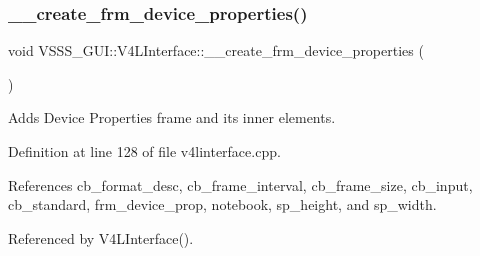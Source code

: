 \subsubsection{\texorpdfstring{\+\_\+\+\_\+create\+\_\+frm\+\_\+device\+\_\+properties()}{\_\_create\_frm\_device\_properties()}}
{\footnotesize\ttfamily void V\+S\+S\+S\+\_\+\+G\+U\+I\+::\+V4\+L\+Interface\+::\+\_\+\+\_\+create\+\_\+frm\+\_\+device\+\_\+properties (\begin{DoxyParamCaption}{ }\end{DoxyParamCaption})\hspace{0.3cm}{\ttfamily [private]}}



Adds Device Properties frame and its inner elements. 



Definition at line 128 of file v4linterface.\+cpp.



References cb\+\_\+format\+\_\+desc, cb\+\_\+frame\+\_\+interval, cb\+\_\+frame\+\_\+size, cb\+\_\+input, cb\+\_\+standard, frm\+\_\+device\+\_\+prop, notebook, sp\+\_\+height, and sp\+\_\+width.



Referenced by V4\+L\+Interface().


